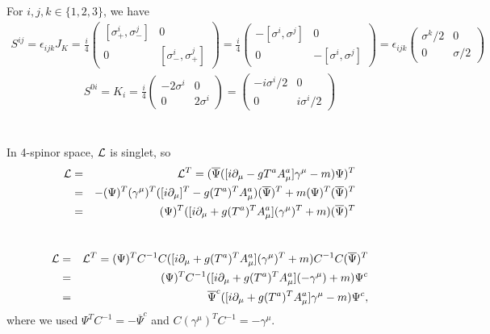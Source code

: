 \documentclass[11pt]{article}
\def\del{{\partial}}
\begin{document}
\section{ }
For $i, j, k\in \{ 1,2,3\}$, we have
\begin{eqnarray}
  S^{ij}=\epsilon_{ijk}J_K=\frac{i}{4}
  \begin{pmatrix}
    [\sigma_+^i,\sigma_-^j] & 0 \\
    0 & [\sigma_-^i,\sigma_+^j]
  \end{pmatrix}
  =\frac{i}{4}
  \begin{pmatrix}
    -[\sigma^i,\sigma^j] & 0 \\
    0 & -[\sigma^i,\sigma^j]
  \end{pmatrix}
  =\epsilon_{ijk}
  \begin{pmatrix}
    \sigma^k/2 & 0\\
    0 & \sigma/2
  \end{pmatrix}
\end{eqnarray}
\begin{eqnarray}
  S^{0i}=K_i=\frac{i}{4}
  \begin{pmatrix}
    -2\sigma^i & 0 \\
    0 & 2\sigma^i
  \end{pmatrix}
  =  \begin{pmatrix}
    -i\sigma^i/2 & 0 \\
    0 & i\sigma^i/2
  \end{pmatrix}
\end{eqnarray}

\section{ }
In 4-spinor space, ${\cal L}$ is singlet, so
\begin{eqnarray}
  {\cal L}&=&  {\cal L}^T
  =  ({\overline \Psi} ([i\del_\mu - g T^a A^a_\mu] \gamma^\mu - m) \Psi)^T \\
  &=& -(\Psi)^T (\gamma^\mu)^T ([i\del_\mu]^T -g(T^a)^T A^a_\mu) ({\overline \Psi})^T
    +m (\Psi)^T  ({\overline \Psi})^T \\
  &=& (\Psi)^T ([i\del_\mu +g(T^a)^TA^a_\mu](\gamma^\mu)^T +m) ({\overline \Psi})^T 
\end{eqnarray}

\section{ }
\begin{eqnarray}
  {\cal L} &=& {\cal L}^T
  = (\Psi)^T C^{-1} C
  ([i\del_\mu +g(T^a)^TA^a_\mu](\gamma^\mu)^T +m) C^{-1} C ({\overline \Psi})^T \\
  &=& (\Psi)^T C^{-1} ([i\del_\mu +g(T^a)^TA^a_\mu](-\gamma^\mu) +m)\Psi^c \\
  &=& \overline{\Psi}^c ([i\del_\mu +g(T^a)^TA^a_\mu] \gamma^\mu -m)\Psi^c,
\end{eqnarray}
where we used $\Psi^T C^{-1} = -\overline{\Psi}^c$ and $C (\gamma^\mu)^T C^{-1} = -\gamma^\mu$.
\end{document}
